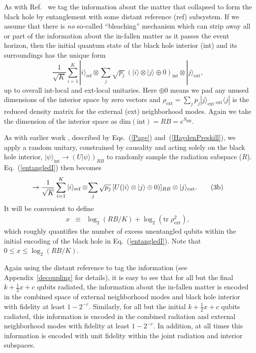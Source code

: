 \documentclass[aps,prl,amsmath,amssymb,floatfix,12pt]{revtex4}
\begin{document}
As with Ref.~ we tag the information about the
matter that collapsed to form the black hole by entanglement with
some distant reference (ref) subsystem. If we assume that there is
{\it no\/} so-called ``bleaching'' mechanism which can strip
away all or part of the information about the in-fallen matter as it
passes the event horizon, then the initial quantum state of the black hole
interior (int) and its surroundings has the unique form \cite{me}
\begin{equation}
\frac{1}{\sqrt{K}}\sum_{i=1}^K |i\rangle_{\text{ref}}\otimes
\sum_{j}\sqrt{p_j}\,(|i\rangle\otimes |j\rangle\oplus 0)_{\text{int}}
\otimes|j\rangle_{\text{ext}}, \tag{3a} \label{entangledI}
\end{equation}
up to overall int-local and ext-local unitaries.
Here $\oplus 0$ means we pad any unused dimensions of the interior
space by zero vectors \cite{me} and
$\rho_{\text{ext}}=\sum_jp_j|j\rangle_{\text{ext}}%
\,{}_{\text{ext}}\!\langle j|$
is the reduced density matrix for the external (ext) neighborhood modes.
Again we take the dimension of the interior space as
$\text{dim}(\text{int})= R B= e^{S_{\text{BH}}}$.

As with earlier work \cite{Page93,Hayden07}, described by Eqs.~(\ref{Page})
and~(\ref{HaydenPreskill}), we apply a random unitary, constrained
by causality and acting solely on the black hole interior,
$|\psi\rangle_{\text{int}}\rightarrow (U|\psi\rangle)_{RB}$ to
randomly sample the radiation subspace ($R$). Eq.~(\ref{entangledI}) 
then becomes 
\begin{equation}
\rightarrow
\frac{1}{\sqrt{K}}\sum_{i=1}^K |i\rangle_{\text{ref}}\otimes
\!\sum_{j}\sqrt{p_j}\,[U(|i\rangle\otimes |j\rangle\oplus 0)]_{RB}
\otimes|j\rangle_{\text{ext}}.
\tag{3b} \label{entangledF}
\setcounter{equation}{3}
\end{equation}
It will be convenient to define
\begin{eqnarray}
x&\equiv& \log_2(RB/K) +\log_2 ({\text{tr}}\; \rho_{\text{ext}}^2),
\end{eqnarray}
which roughly quantifies the number of excess unentangled qubits
within the initial encoding of the black hole in Eq.~(\ref{entangledI}).
Note that $0\le x \le \log_2(RB/K)$.

Again using the distant reference to tag the information (see
Appendix~\ref{decoupling} for details), it is easy to see that for all
but the final $k+\frac{1}{2}x+c$ qubits radiated, the information about
the in-fallen matter is encoded in the combined space of external
neighborhood modes and black hole interior with fidelity at least
$1-2^{-c}$. Similarly, for all but the initial $k+\frac{1}{2}x+c$
qubits radiated, this information is encoded in the combined radiation
and external neighborhood modes with fidelity at least $1-2^{-c}$.
In addition, at all times this information is encoded with unit
fidelity within the joint radiation and interior subspaces.
\end{document}
